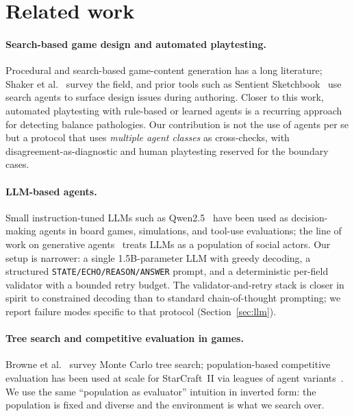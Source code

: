 \documentclass[10pt]{article}
\begin{document}
\section{Related work}\label{sec:related}

\paragraph{Search-based game design and automated playtesting.}
Procedural and search-based game-content generation has a long
literature; Shaker et al.~\cite{togelius_pcg} survey the field, and
prior tools such as Sentient Sketchbook~\cite{liapis_sentient} use
search agents to surface design issues during authoring. Closer to
this work, automated playtesting with rule-based or learned agents
is a recurring approach for detecting balance pathologies. Our
contribution is not the use of agents per se but a protocol that
uses \emph{multiple agent classes} as cross-checks, with
disagreement-as-diagnostic and human playtesting reserved for the
boundary cases.

\paragraph{LLM-based agents.} Small instruction-tuned LLMs such as
Qwen2.5~\cite{qwen25} have been used as decision-making agents in
board games, simulations, and tool-use evaluations; the line of
work on generative agents~\cite{park_generative_agents} treats LLMs
as a population of social actors. Our setup is narrower: a single
1.5B-parameter LLM with greedy decoding, a structured
\texttt{STATE/ECHO/REASON/ANSWER} prompt, and a deterministic
per-field validator with a bounded retry budget. The
validator-and-retry stack is closer in spirit to constrained
decoding than to standard chain-of-thought prompting; we report
failure modes specific to that protocol (Section~\ref{sec:llm}).

\paragraph{Tree search and competitive evaluation in games.}
Browne et al.~\cite{browne_mcts} survey Monte Carlo tree search;
population-based competitive evaluation has been used at scale for
StarCraft~II via leagues of agent variants~\cite{alphastar}. We use
the same ``population as evaluator'' intuition in inverted form:
the population is fixed and diverse and the environment is what we
search over.
\end{document}
